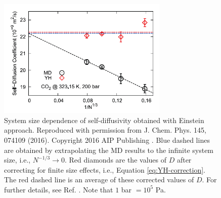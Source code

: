 \documentclass[9pt,bestpractices]{livecoms}
\begin{document}
\begin{figure}[htb!]
	\centering
	\includegraphics[width=3.2in]{MoultosFig1.png}
	\caption{System size dependence of self-diffusivity obtained with Einstein approach. Reproduced with permission from J. Chem. Phys. 145, 074109 (2016). Copyright 2016 AIP Publishing \cite{Moultos2016}. Blue dashed lines are obtained by extrapolating the MD results to the infinite system size, i.e., $N^{-1/3} \to 0$. Red diamonds are the values of $D$ after correcting for finite size effects, i.e., Equation \ref{eq:YH-correction}. The red dashed line is an average of these corrected values of $D$. For further details, see Ref. \cite{Moultos2016}. Note that $1$ bar $ = 10^5$ Pa.}
	\label{fig:MoultosFig1}
\end{figure}



%
\end{document}
